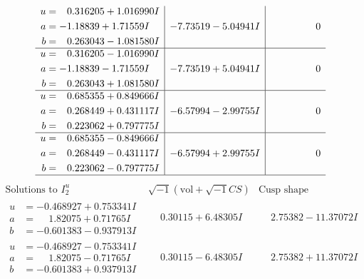 \documentclass[1p]{elsarticle_modified}
\theoremstyle{definition}
\newcommand{\I}{\sqrt{-1}}
\begin{document}
$$\begin{array}{c|c|c}
\begin{aligned}
u &= \phantom{-}0.316205 + 1.016990 I \\
a &= -1.18839 + 1.71559 I \\
b &= \phantom{-}0.263043 - 1.081580 I\end{aligned}
 & -7.73519 - 5.04941 I & \phantom{-0.000000 } 0 \\ \hline\begin{aligned}
u &= \phantom{-}0.316205 - 1.016990 I \\
a &= -1.18839 - 1.71559 I \\
b &= \phantom{-}0.263043 + 1.081580 I\end{aligned}
 & -7.73519 + 5.04941 I & \phantom{-0.000000 } 0 \\ \hline\begin{aligned}
u &= \phantom{-}0.685355 + 0.849666 I \\
a &= \phantom{-}0.268449 + 0.431117 I \\
b &= \phantom{-}0.223062 + 0.797775 I\end{aligned}
 & -6.57994 - 2.99755 I & \phantom{-0.000000 } 0 \\ \hline\begin{aligned}
u &= \phantom{-}0.685355 - 0.849666 I \\
a &= \phantom{-}0.268449 - 0.431117 I \\
b &= \phantom{-}0.223062 - 0.797775 I\end{aligned}
 & -6.57994 + 2.99755 I & \phantom{-0.000000 } 0\\
 \hline 
 \end{array}$$\newpage$$\begin{array}{c|c|c}  
\text{Solutions to }I^u_{2}& \I (\text{vol} + \sqrt{-1}CS) & \text{Cusp shape}\\
 \hline 
\begin{aligned}
u &= -0.468927 + 0.753341 I \\
a &= \phantom{-}1.82075 + 0.71765 I \\
b &= -0.601383 - 0.937913 I\end{aligned}
 & \phantom{-}0.30115 + 6.48305 I & \phantom{-}2.75382 - 11.37072 I \\ \hline\begin{aligned}
u &= -0.468927 - 0.753341 I \\
a &= \phantom{-}1.82075 - 0.71765 I \\
b &= -0.601383 + 0.937913 I\end{aligned}
 & \phantom{-}0.30115 - 6.48305 I & \phantom{-}2.75382 + 11.37072 I \\ \hline\begin{aligned}

\end{aligned}
\end{array}$$
\end{document}
